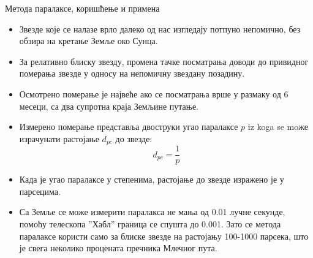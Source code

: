 \documentclass[aspectratio=169, xcolor=table, 10pt]{beamer}
\theoremstyle{definition}
\begin{document}
\begin{frame}{Метода паралаксе, коришћење и примена}
  \begin{itemize}
    \item Звезде које се налазе врло далеко од нас изгледају потпуно непомично, без обзира на кретање Земље око Сунца.
    \item За релативно блиску звезду, промена тачке посматрања доводи до привидног померања звезде у односу на непомичну звездану позадину\cite{dina}.
    \item Осмотрено померање је највеће ако се посматрања врше у размаку од 6 месеци, са два супротна краја Земљине путање.
    \item Измерено померање представља двоструки угао паралаксе $p$ iz koga se moже израчунати растојање $d_{pc}$ до звезде:
      \begin{equation*}
        d_{pc}=\frac{1}{p}
      \end{equation*}
    \item Када је угао паралаксе у степенима, растојање до звезде изражено је у парсецима.
    \item Са Земље се може измерити паралакса не мања од 0.01 лучне секунде, помоћу телескопа ”Хабл” граница се спушта до 0.001. Зато се метода паралаксе користи само за блиске звезде на растојању 100-1000 парсека, што је свега неколико процената пречника Млечног пута.
  \end{itemize}
\end{frame}
\end{document}
